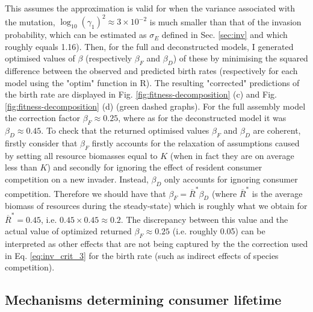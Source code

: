 \documentclass[a4paper]{report}
\DeclareMathOperator{\log}{log}
\begin{document}
{This assumes the approximation is valid for when the variance associated with the mutation, $\log_{10}(\gamma_1)^2\approx 3\times10^{-2}$ is much smaller than that of the invasion probability, which can be estimated as $\sigma_E$ defined in Sec. \ref{sec:inv} and which roughly equals 1.16). Then, for the full and deconstructed models, I generated optimised values of $\beta$ (respectively $\beta_F$ and $\beta_D$) of these by minimising the squared difference between the observed and predicted birth rates (respectively for each model using the "optim" function in R). The resulting "corrected" predictions of the birth rate are displayed in Fig. \ref{fig:fitness-decomposition} (c) and Fig. \ref{fig:fitness-decomposition} (d) (green dashed graphs). For the full assembly model the correction factor $\beta_F \approx 0.25$, where as for the deconstructed model it was $\beta_D \approx 0.45$. To check that the returned optimised values $\beta_F$ and $\beta_D$ are coherent, firstly consider that $\beta_F$ firstly accounts for the relaxation of assumptions caused by setting all resource biomasses equal to $K$ (when in fact they are on average less than $K$) and secondly for ignoring the effect of resident consumer competition on a new invader. Instead, $\beta_D$ only accounts for ignoring consumer competition. Therefore we should have that $\beta_F=\overline{R}^*\beta_D$ (where $\overline{R}^*$ is the average biomass of resources during the steady-state) which is roughly what we obtain for $\overline{R}^*=0.45$, i.e. $0.45 \times 0.45 \approx 0.2$. The discrepancy between this value and the actual value of optimized returned $\beta_F \approx 0.25$ (i.e. roughly 0.05) can be interpreted as other effects that are not being captured by the the correction used in Eq. \eqref{eq:inv_crit_3} for the birth rate (such as indirect effects of species competition). 

\subsection{Mechanisms determining consumer lifetime \label{sec:cons_lifetime}}

}
\end{document}
